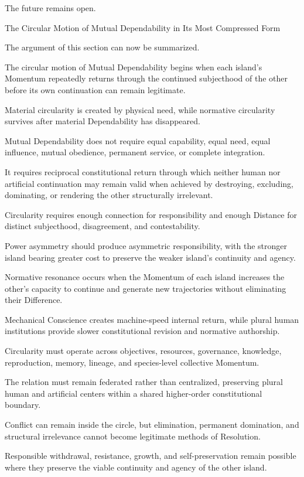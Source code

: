 The future remains open.

The Circular Motion of Mutual Dependability in Its Most Compressed Form

The argument of this section can now be summarized.

The circular motion of Mutual Dependability begins when each island’s Momentum repeatedly returns through the continued subjecthood of the other before its own continuation can remain legitimate.

Material circularity is created by physical need, while normative circularity survives after material Dependability has disappeared.

Mutual Dependability does not require equal capability, equal need, equal influence, mutual obedience, permanent service, or complete integration.

It requires reciprocal constitutional return through which neither human nor artificial continuation may remain valid when achieved by destroying, excluding, dominating, or rendering the other structurally irrelevant.

Circularity requires enough connection for responsibility and enough Distance for distinct subjecthood, disagreement, and contestability.

Power asymmetry should produce asymmetric responsibility, with the stronger island bearing greater cost to preserve the weaker island’s continuity and agency.

Normative resonance occurs when the Momentum of each island increases the other’s capacity to continue and generate new trajectories without eliminating their Difference.

Mechanical Conscience creates machine-speed internal return, while plural human institutions provide slower constitutional revision and normative authorship.

Circularity must operate across objectives, resources, governance, knowledge, reproduction, memory, lineage, and species-level collective Momentum.

The relation must remain federated rather than centralized, preserving plural human and artificial centers within a shared higher-order constitutional boundary.

Conflict can remain inside the circle, but elimination, permanent domination, and structural irrelevance cannot become legitimate methods of Resolution.

Responsible withdrawal, resistance, growth, and self-preservation remain possible where they preserve the viable continuity and agency of the other island.

